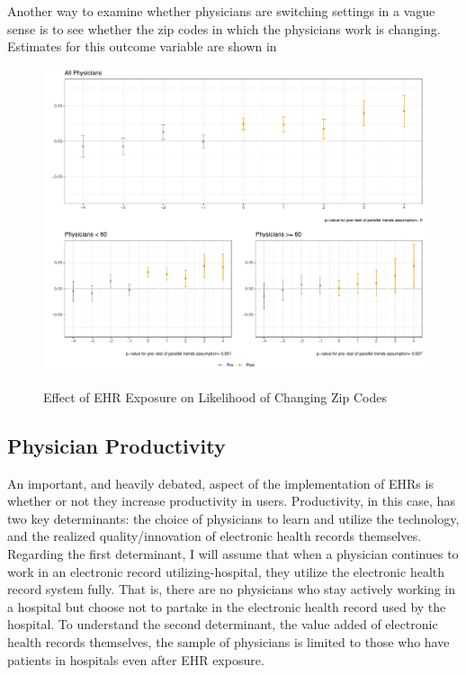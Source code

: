 \documentclass[11pt]{article}
\begin{document}
Another way to examine whether physicians are switching settings in a vague sense is to see whether the zip codes in which the physicians work is changing. Estimates for this outcome variable are shown in

\begin{figure}[ht]
    \centering
    \caption{Effect of EHR Exposure on Likelihood of Changing Zip Codes}
    \includegraphics[scale=.57]{Objects/zip_plot.pdf}
    \label{fig:zip}
\end{figure}




\subsection{Physician Productivity}

An important, and heavily debated, aspect of the implementation of EHRs is whether or not they increase productivity in users. Productivity, in this case, has two key determinants: the choice of physicians to learn and utilize the technology, and the realized quality/innovation of electronic health records themselves. Regarding the first determinant, I will assume that when a physician continues to work in an electronic record utilizing-hospital, they utilize the electronic health record system fully. That is, there are no physicians who stay actively working in a hospital but choose not to partake in the electronic health record used by the hospital. To understand the second determinant, the value added of electronic health records themselves, the sample of physicians is limited to those who have patients in hospitals even after EHR exposure. 
\end{document}
